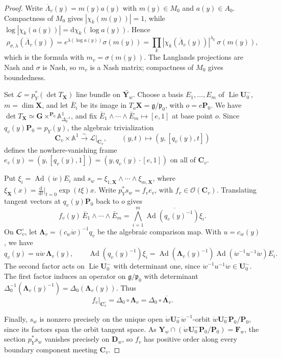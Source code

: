 \documentclass[a4paper,12pt]{amsart}
\numberwithin{equation}{section}
\theoremstyle{definition}
\theoremstyle{remark}
\newcommand{\G}{\mathbf G}
\newcommand{\pP}{\mathbf P}
\newcommand{\U}{\mathbf U}
\newcommand{\X}{\mathbf X}
\newcommand{\Y}{\mathbf Y}
\newcommand{\F}{\mathbf F}
\newcommand{\D}{\mathbf D}
\newcommand{\fg}{\mathfrak g}
\newcommand{\fp}{\mathfrak p}
\newcommand{\Ad}{\operatorname{Ad}}
\newcommand{\Lie}{\operatorname{Lie}}
\newcommand{\dd}{\mathrm d}
\newcommand{\cC}{\mathbf C}
\newcommand{\lLd}{\boldsymbol\Lambda}
\newcommand{\mcL}{\mathcal L}
\begin{document}
\begin{proof}
Write $\overline\Lambda_v(y)=m(y)a(y)$ with $m(y)\in M_0$ and $a(y)\in A_0$. Compactness of $M_0$ gives $|\chi_k(m(y))|=1$, while $\log|\chi_k(a(y))|=\dd\chi_k(\log a(y))$. Hence
\[
 \rho_{\sigma,\lambda}(\overline\Lambda_v(y))=e^{\lambda(\log a(y))}\sigma(m(y))=\prod_k|\chi_k(\overline\Lambda_v(y))|^{\lambda_k}\,\sigma(m(y)),
\]
which is the formula with $m_v=\sigma(m(y))$. The Langlands projections are Nash and $\sigma$ is Nash, so $m_v$ is a Nash matrix; compactness of $M_0$ gives boundedness.

Set $\mcL=p_Y^*(\det T_\X)$ line bundle on $\widetilde{\Y_w}$. Choose a basis $E_1,\dots,E_m$ of $\Lie\U_0^-$, $m=\dim\X$, and let $\bar E_i$ be its image in $T_o\X=\fg/\fp_0$, with $o=e\pP_0$. We have
$\det T_\X\simeq\G\times^{\pP_0}\mathbb A^1_{\Delta_0^{-1}}$, and fix $\bar E_1\wedge\cdots\wedge\bar E_m\mapsto [e,1]$ at base point $o$.
Since $q_v(y)\pP_0=p_Y(y)$, the algebraic trivialization
\[
 \cC_v\times\mathbb A^1\xrightarrow{\sim}\mcL|_{\cC_v},
 \qquad (y,t)\longmapsto(y,[q_v(y),t])
\]
defines the nowhere-vanishing frame $e_v(y)=(y,[q_v(y),1])=(y,q_v(y)\cdot[e,1])$ on all of $\cC_v$.

Put $\xi_i=\Ad(\dot w)E_i$ and $s_w=\xi_{1,\X}\wedge\cdots\wedge\xi_{m,\X}$, where $\xi_\X(x)=\frac{\dd}{\dd t}|_{t=0}\exp(t\xi)x$. Write $p_Y^*s_w=f_ve_v$, with $f_v\in\mathcal O(\cC_v)$. Translating tangent vectors at $q_v(y)\pP_0$ back to $o$ gives
\[
 f_v(y)\,\bar E_1\wedge\cdots\wedge\bar E_m
 =\bigwedge_{i=1}^m\overline{\Ad(q_v(y)^{-1})\xi_i}.
\]
On $\cC_v^\circ$, let $\lLd_v=(c_w\dot w)^{-1}q_v$ be the algebraic comparison map. With $u=c_w(y)$, we have
\[
 q_v(y)=u\dot w\,\lLd_v(y),\qquad
 \Ad(q_v(y)^{-1})\xi_i
 =\Ad(\lLd_v(y)^{-1})\Ad(\dot w^{-1}u^{-1}\dot w)E_i.
\]
The second factor acts on $\Lie\U_0^-$ with determinant one, since $\dot w^{-1}u^{-1}\dot w\in\U_0^-$. The first factor induces an operator on $\fg/\fp_0$ with determinant $\Delta_0^{-1}(\lLd_v(y)^{-1})=\Delta_0(\lLd_v(y))$. Thus
\[
 f_v|_{\cC_v^\circ}=\Delta_0\circ\lLd_v
 =\Delta_0\circ\overline{\lLd_v}.
\]

Finally, $s_w$ is nonzero precisely on the unique open $\dot w\U_0^-\dot w^{-1}$-orbit $\dot w\U_0^-\pP_0/\pP_0$, since its factors span the orbit tangent space. As $\Y_w\cap(\dot w\U_0^-\pP_0/\pP_0)=\F_w$, the section $p_Y^*s_w$ vanishes precisely on $\D_w$, so $f_v$ has positive order along every boundary component meeting $\cC_v$.
\end{proof}
\end{document}
